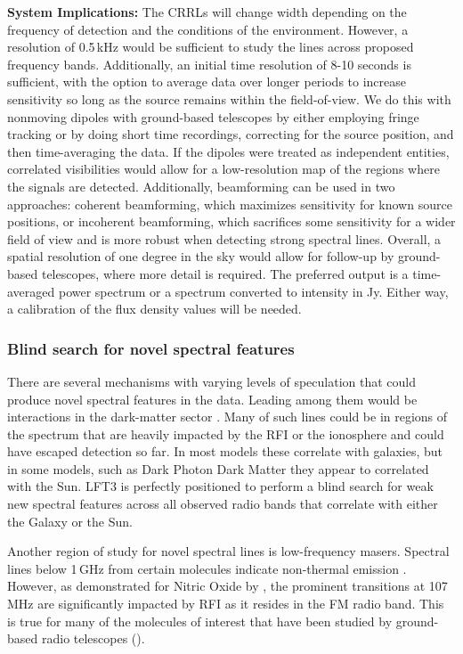 \textbf{System Implications:} The CRRLs will change width depending on the frequency of detection and the conditions of the environment. However, a resolution of 0.5\,kHz would be sufficient to study the lines across proposed frequency bands. Additionally, an initial time resolution of 8-10 seconds is sufficient, with the option to average data over longer periods to increase sensitivity so long as the source remains within the field-of-view. We do this with nonmoving dipoles with ground-based telescopes by either employing fringe tracking or by doing short time recordings, correcting for the source position, and then time-averaging the data. If the dipoles were treated as independent entities, correlated visibilities would allow for a low-resolution map of the regions where the signals are detected. Additionally, beamforming can be used in two approaches: coherent beamforming, which maximizes sensitivity for known source positions, or incoherent beamforming, which sacrifices some sensitivity for a wider field of view and is more robust when detecting strong spectral lines. Overall, a spatial resolution of one degree in the sky would allow for follow-up by ground-based telescopes, where more detail is required. The preferred output is a time-averaged power spectrum or a spectrum converted to intensity in Jy. Either way, a calibration of the flux density values will be needed.

\subsubsection{Blind search for novel spectral features}

There are several mechanisms with varying levels of speculation that could produce novel spectral features in the data. Leading among them would be interactions in the dark-matter sector \cite{2025ApJ...984L..24K}.  Many of such lines could be in regions of the spectrum that are heavily impacted by the RFI or the ionosphere and could have escaped detection so far. In most models these correlate with galaxies, but in some models, such as Dark Photon Dark Matter \citep{2025PhRvL.134q1001A} they appear to correlated with the Sun.  LFT3 is perfectly positioned to perform a blind search for weak new spectral features across all observed radio bands that correlate with either the Galaxy or the Sun. 

Another region of study for novel spectral lines is low-frequency masers. Spectral lines below 1\,GHz from certain molecules indicate non-thermal emission \citep{Tremblay_2017}. However, as demonstrated for Nitric Oxide by \cite{Tremblay_2020_NO}, the prominent transitions at 107\,MHz are significantly impacted by RFI as it resides in the FM radio band. This is true for many of the molecules of interest that have been studied by ground-based radio telescopes (\citealt{Jacob_2024}).

